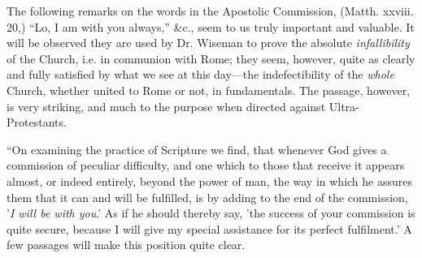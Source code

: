 The
following remarks on the words in the Apostolic Commission, (Matth.
xxviii. 20,) ``Lo, I am with you always,'' \&c., seem to us truly
important and valuable. It will be observed they are used by Dr. Wiseman
to prove the absolute \emph{infallibility} of the Church, i.e. in
communion with Rome; they seem, however, quite as clearly and fully
satisfied by what we see at this day—the indefectibility of the \emph{whole}
Church, whether united to Rome or not, in fundamentals. The passage,
however, is very striking, and much to the purpose when directed against
Ultra-Protestants.

``On
examining the practice of Scripture we find, that whenever God gives a
commission of peculiar difficulty, and one which to those that receive
it appears almost, or indeed entirely, beyond the power of man, the way
in which he assures them that it can and will be fulfilled, is by adding
to the end of the commission, '\emph{I will be with you}.' As if he
should thereby say, 'the success of your commission is quite secure,
because I will give my special assistance for its perfect fulfilment.'
A few passages will make this position quite clear.

